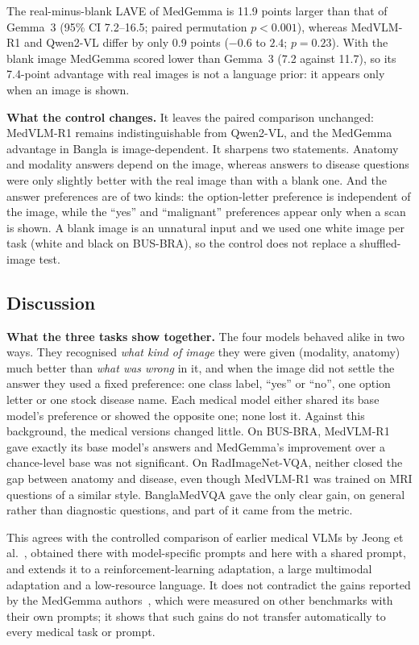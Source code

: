 \documentclass[doublecolumn]{ijcvsplatex}
\newcommand{\qwen}{Qwen2-VL}
\newcommand{\medvlm}{MedVLM-R1}
\newcommand{\gemma}{Gemma~3}
\newcommand{\medgemma}{MedGemma}
\begin{document}
{The real-minus-blank LAVE of \medgemma{} is 11.9 points larger than that of \gemma{} (95\% CI 7.2--16.5; paired permutation $p<0.001$), whereas \medvlm{} and \qwen{} differ by only 0.9 points ($-0.6$ to $2.4$; $p=0.23$). With the blank image \medgemma{} scored lower than \gemma{} (7.2 against 11.7), so its 7.4-point advantage with real images is not a language prior: it appears only when an image is shown.

\textbf{What the control changes.} It leaves the paired comparison unchanged: \medvlm{} remains indistinguishable from \qwen{}, and the \medgemma{} advantage in Bangla is image-dependent. It sharpens two statements. Anatomy and modality answers depend on the image, whereas answers to disease questions were only slightly better with the real image than with a blank one. And the answer preferences are of two kinds: the option-letter preference is independent of the image, while the ``yes'' and ``malignant'' preferences appear only when a scan is shown. A blank image is an unnatural input and we used one white image per task (white and black on BUS-BRA), so the control does not replace a shuffled-image test.
}


\subsection{Discussion}
\textbf{What the three tasks show together.} The four models behaved alike in two ways. They recognised \emph{what kind of image} they were given (modality, anatomy) much better than \emph{what was wrong} in it, and when the image did not settle the answer they used a fixed preference: one class label, ``yes'' or ``no'', one option letter or one stock disease name. Each medical model either shared its base model's preference or showed the opposite one; none lost it. Against this background, the medical versions changed little. On BUS-BRA, \medvlm{} gave exactly its base model's answers and \medgemma{}'s improvement over a chance-level base was not significant. On RadImageNet-VQA, neither closed the gap between anatomy and disease, even though \medvlm{} was trained on MRI questions of a similar style. BanglaMedVQA gave the only clear gain, on general rather than diagnostic questions, and part of it came from the metric.

This agrees with the controlled comparison of earlier medical VLMs by Jeong et al.~\cite{jeong2025limited}, obtained there with model-specific prompts and here with a shared prompt, and extends it to a reinforcement-learning adaptation, a large multimodal adaptation and a low-resource language. It does not contradict the gains reported by the \medgemma{} authors~\cite{sellergren2025medgemma}, which were measured on other benchmarks with their own prompts; it shows that such gains do not transfer automatically to every medical task or prompt.
\end{document}
